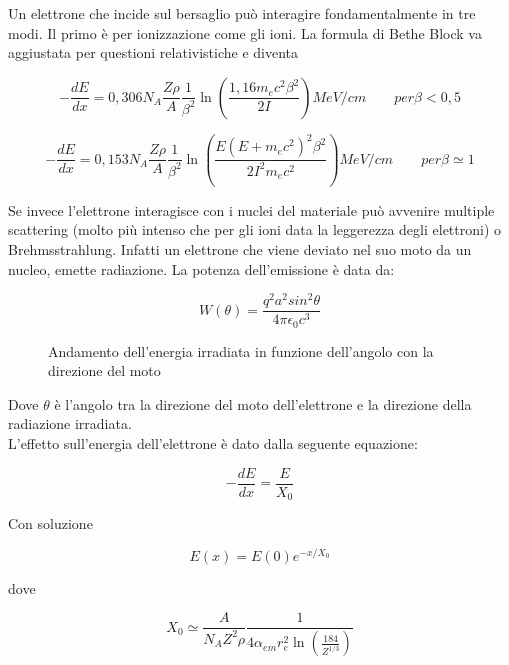 \documentclass [a4paper, twoside] {book}
\begin{document}
Un elettrone che incide sul bersaglio può interagire fondamentalmente in tre modi. Il primo è per ionizzazione come gli ioni. La formula di Bethe Block va aggiustata per questioni relativistiche e diventa

\begin{equation}
-\frac{dE}{dx}=0,306 N_A\frac{Z\rho}{A}\frac{1}{\beta^2}\ln(\frac{1,16m_ec^2\beta^2}{2I}) MeV/cm\qquad per \beta<0,5
\end{equation}

\begin{equation}
-\frac{dE}{dx}=0,153 N_A\frac{Z\rho}{A}\frac{1}{\beta^2}\ln(\frac{E(E+m_ec^2)^2\beta^2}{2I^2m_ec^2}) MeV/cm \qquad per \beta\simeq 1
\end{equation}

Se invece l'elettrone interagisce con i nuclei del materiale può avvenire multiple scattering (molto più intenso che per gli ioni data la leggerezza degli elettroni) o Brehmsstrahlung. 
Infatti un elettrone che viene deviato nel suo moto da un nucleo, emette radiazione. La potenza dell'emissione è data da:

\begin{equation}
W(\theta)=\frac{q^2a^2sin^2\theta}{4\pi\epsilon_{0}c^3}
\end{equation}

\begin{figure} []
\centering
		\caption{Andamento dell'energia irradiata in funzione dell'angolo con la direzione del moto}
         \label{brehmtheta}
\end{figure}

Dove $\theta$ è l'angolo tra la direzione del moto dell'elettrone e la direzione della radiazione irradiata.\\

L'effetto sull'energia dell'elettrone è dato dalla seguente equazione:

\begin{equation}
-\frac{dE}{dx}=\frac{E}{X_0}
\end{equation}

Con soluzione

\begin{equation}
E(x)=E(0)e^{-x/X_0}
\end{equation}

dove 

\begin{equation}
X_0\simeq\frac{A}{N_A Z^2 \rho}\frac{1}{4 \alpha_{em}r_e^2 \ln(\frac{184}{Z^{1/3}})}
\end{equation}
\end{document}
